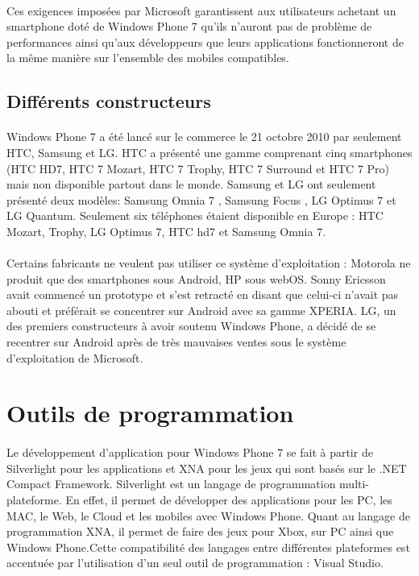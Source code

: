 \documentclass[twoside,UTF8]{EPURapport}
\begin{document}
\paragraph{}
Ces exigences imposées par Microsoft garantissent aux utilisateurs achetant un smartphone doté de Windows Phone 7 qu'ils n'auront pas de problème de performances ainsi qu'aux développeurs que leurs applications fonctionneront de la même manière sur l'ensemble des mobiles compatibles. 

	\subsection{Différents constructeurs}
\paragraph{}
Windows Phone 7 a été lancé sur le commerce le 21 octobre 2010 par seulement HTC, Samsung et LG. HTC a présenté une gamme comprenant cinq smartphones (HTC HD7, HTC 7 Mozart, HTC 7 Trophy, HTC 7 Surround et HTC 7 Pro) mais non disponible partout dans le monde. Samsung et LG ont seulement présenté deux modèles: Samsung Omnia 7 , Samsung Focus , LG Optimus 7 et LG Quantum. Seulement six téléphones étaient disponible en Europe : HTC Mozart, Trophy, LG Optimus 7, HTC hd7 et Samsung Omnia 7.

\paragraph{}
Certains fabricants ne veulent pas utiliser ce système d'exploitation : Motorola ne produit que des smartphones sous Android, HP sous webOS. Sonny Ericsson avait commencé un prototype et s'est retracté en disant que celui-ci n'avait pas abouti et préférait se concentrer sur Android avec sa gamme XPERIA. LG, un des premiers constructeurs à avoir soutenu Windows Phone, a décidé de se recentrer sur Android après de très mauvaises ventes sous le système d'exploitation de Microsoft.

	
\section{Outils de programmation}

\paragraph{}
Le développement d'application pour Windows Phone 7 se fait à partir de Silverlight pour les applications et XNA pour les jeux qui sont basés sur le .NET Compact Framework. Silverlight est un langage de programmation multi-plateforme. En effet, il permet de développer des applications pour les PC, les MAC, le Web, le Cloud et les mobiles avec Windows Phone. Quant au langage de programmation XNA, il permet de faire des jeux pour Xbox, sur PC ainsi que Windows Phone.Cette compatibilité des langages entre différentes plateformes est accentuée par l'utilisation d'un seul outil de programmation : Visual Studio. 
\end{document}

